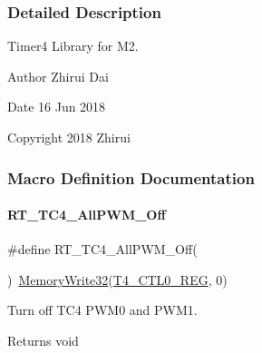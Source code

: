 \subsubsection{Detailed Description}
Timer4 Library for M2. 

\begin{DoxyAuthor}{Author}
Zhirui Dai 
\end{DoxyAuthor}
\begin{DoxyDate}{Date}
16 Jun 2018 
\end{DoxyDate}
\begin{DoxyCopyright}{Copyright}
2018 Zhirui 
\end{DoxyCopyright}


\subsubsection{Macro Definition Documentation}
\mbox{\label{a00086_a810820140a90f26db974ea72d81fac27}} 
\paragraph{\texorpdfstring{R\+T\+\_\+\+T\+C4\+\_\+\+All\+P\+W\+M\+\_\+\+Off}{RT\_TC4\_AllPWM\_Off}}
{\footnotesize\ttfamily \#define R\+T\+\_\+\+T\+C4\+\_\+\+All\+P\+W\+M\+\_\+\+Off(\begin{DoxyParamCaption}{ }\end{DoxyParamCaption})~\mbox{\hyperlink{a00026_a6b9732365b12e48ddb89fe1028b975b0}{Memory\+Write32}}(\mbox{\hyperlink{a00026_a83136367fd85cd43cec90995ad0f51ef}{T4\+\_\+\+C\+T\+L0\+\_\+\+R\+EG}}, 0)}



Turn off T\+C4 P\+W\+M0 and P\+W\+M1. 

\begin{DoxyReturn}{Returns}
void 
\end{DoxyReturn}
\mbox{\label{a00086_af7e9317dddf60349a86619afdef1fba8}} 
